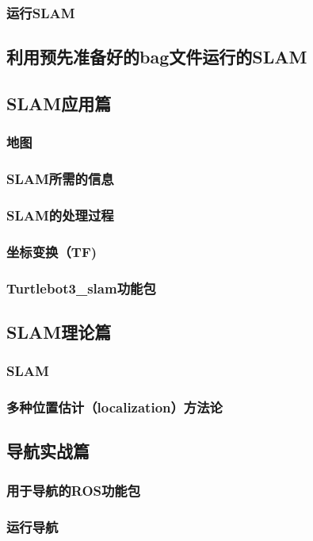 \documentclass[geye,green,kindle,cn]{elegantnote}
\begin{document}
\subsubsection{运行SLAM}
\subsection{利用预先准备好的bag文件运行的SLAM}
\subsection{SLAM应用篇}
\subsubsection{地图}
\subsubsection{SLAM所需的信息}
\subsubsection{SLAM的处理过程}
\subsubsection{坐标变换（TF)}
\subsubsection{Turtlebot3\_slam功能包}
\subsection{SLAM理论篇}
\subsubsection{SLAM}
\subsubsection{多种位置估计（localization）方法论}
\subsection{导航实战篇}
\subsubsection{用于导航的ROS功能包}
\subsubsection{运行导航}
\end{document}
